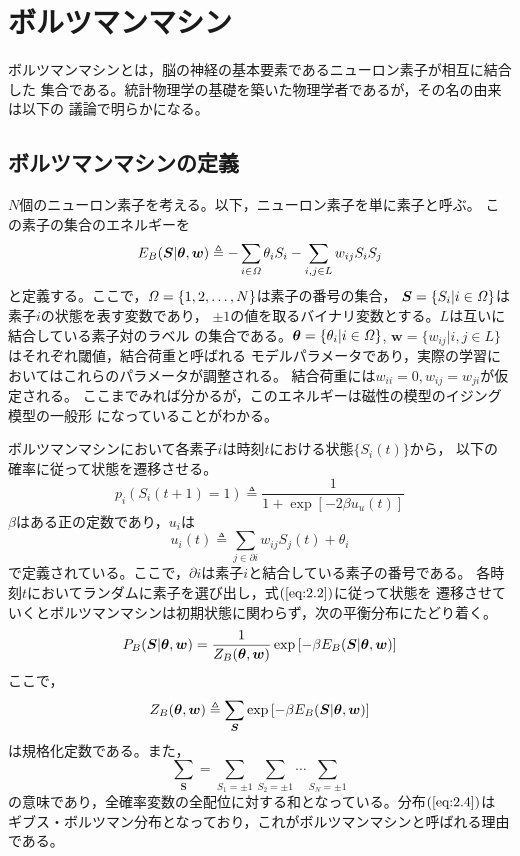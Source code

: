 \chapter{ボルツマンマシン}
ボルツマンマシンとは，脳の神経の基本要素であるニューロン素子が相互に結合した
集合である。統計物理学の基礎を築いた物理学者であるが，その名の由来は以下の
議論で明らかになる。

\section{ボルツマンマシンの定義}
$N$個のニューロン素子を考える。以下，ニューロン素子を単に素子と呼ぶ。
この素子の集合のエネルギーを
\begin{equation}
E_{B}(\bm{S}|\boldsymbol{\theta},\bm{w})\triangleq-\sum_{i\in\mathit{\Omega}}\theta_{i}S_{i}
-\sum_{i,j\in L}w_{ij}S_{i}S_{j}\label{eq:2.1}
\end{equation}
と定義する。ここで，$\mathit{\Omega}=\{1,2,\ldots,N\}$は素子の番号の集合，
$\bm{S}=\{S_{i}|i\in\mathit{\Omega}\}$は素子$i$の状態を表す変数であり，
$\pm 1$の値を取るバイナリ変数とする。$L$は互いに結合している素子対のラベル
の集合である。$\boldsymbol{\theta}=\{\theta_{i}|i\in\mathit{\Omega}\}$,
$\bm{w}=\{w_{ij}|i,j\in L\}$はそれぞれ閾値，結合荷重と呼ばれる
モデルパラメータであり，実際の学習においてはこれらのパラメータが調整される。
結合荷重には$w_{ii}=0,w_{ij}=w_{ji}$が仮定される。
ここまでみれば分かるが，このエネルギーは磁性の模型のイジング模型の一般形
になっていることがわかる。

ボルツマンマシンにおいて各素子$i$は時刻$t$における状態$\{S_{i}(t)\}$から，
以下の確率に従って状態を遷移させる。
\begin{equation}
p_{i}(S_{i}(t+1)=1)\triangleq\frac{1}{1+\exp[-2\beta u_{u}(t)]}
\label{eq:2.2}
\end{equation}
$\beta$はある正の定数であり，$u_{i}$は
\begin{equation}
u_{i}(t)\triangleq\sum_{j\in\partial i}w_{ij}S_{j}(t)+\theta_{i}
\label{eq:2.3}
\end{equation}
で定義されている。ここで，$\partial i$は素子$i$と結合している素子の番号である。
各時刻$t$においてランダムに素子を選び出し，式$(\ref{eq:2.2})$に従って状態を
遷移させていくとボルツマンマシンは初期状態に関わらず，次の平衡分布にたどり着く。
\begin{equation}
P_{B}(\bm{S}|\boldsymbol{\theta},\bm{w})=\frac{1}{Z_{B}(\boldsymbol{\theta},\bm{w})}
\exp\left[-\beta E_{B}(\bm{S}|\boldsymbol{\theta},\bm{w})\right]
\label{eq:2.4}
\end{equation}
ここで，
\begin{equation}
Z_{B}(\boldsymbol{\theta},\bm{w})\triangleq\sum_{\bm{S}}\exp
\left[-\beta E_{B}(\bm{S}|\boldsymbol{\theta},\bm{w})\right]
\label{eq:2.5}
\end{equation}
は規格化定数である。また，
\begin{equation}
\sum_{\bm{S}}=\sum_{S_{1}=\pm 1}\sum_{S_{2}=\pm 1}\cdots\sum_{S_{N}=\pm 1}
\nonumber
\end{equation}
の意味であり，全確率変数の全配位に対する和となっている。分布$(\ref{eq:2.4})$は
ギブス・ボルツマン分布となっており，これがボルツマンマシンと呼ばれる理由である。


